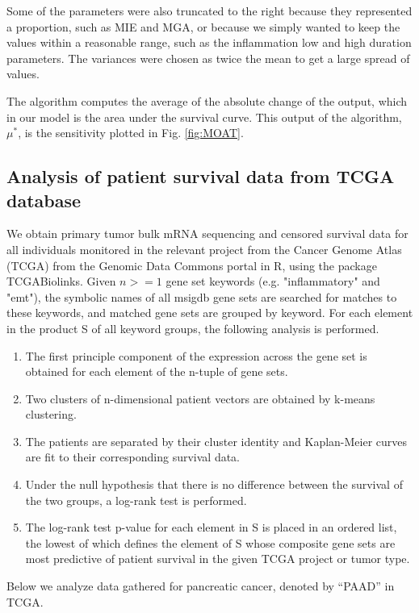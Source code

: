 \documentclass[11pt]{article}
\newcommand{\tcr} { \textcolor{red} }
\begin{document}
Some of the parameters were also truncated to the right because they represented a proportion, such as MIE and MGA, or because we simply wanted to keep the values within a reasonable range, such as the inflammation low and high duration parameters.
The variances were chosen as twice the mean to get a large spread of values.
\par
The algorithm computes the average of the absolute change of the output, which in our model is the area under the survival curve.
This output of the algorithm, $\mu^*$, is the sensitivity plotted in Fig. \ref{fig:MOAT}.


\subsection{Analysis of patient survival data from TCGA database}
We obtain primary tumor bulk mRNA sequencing and censored survival data for all individuals monitored in the relevant project from the Cancer Genome Atlas (TCGA) from the Genomic Data Commons portal in R, using the package TCGABiolinks.  Given $n >= 1$ gene set keywords (e.g. "inflammatory" and "emt"), the symbolic names of all msigdb gene sets are searched for matches to these keywords, and matched gene sets are grouped by keyword. For each element in the product S of all keyword groups, the following analysis is performed.
\begin{enumerate}
     \item The first principle component of the expression across the gene set is obtained for each element of the n-tuple of gene sets.
     \item Two clusters of n-dimensional patient vectors are obtained by k-means clustering.
     \item The patients are separated by their cluster identity and Kaplan-Meier curves are fit to their corresponding survival data.
     \item Under the null hypothesis that there is no difference between the survival of the two groups, a log-rank test is performed.
     \item The log-rank test p-value for each element in S is placed in an ordered list, the lowest of which defines the element of S whose composite gene sets are most predictive of patient survival in the given TCGA project or tumor type.
\end{enumerate}
Below we analyze data gathered for pancreatic cancer, denoted by ``PAAD'' in TCGA.     
\end{document}
